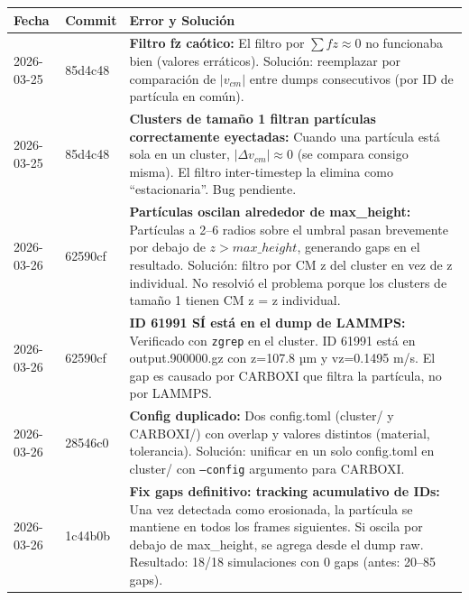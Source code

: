 \documentclass[12pt,a4paper]{article}
\begin{document}
\begin{table}[H]
	\centering
	\begin{tabular}{@{}llp{9cm}@{}}
		\toprule
		\textbf{Fecha} & \textbf{Commit} & \textbf{Error y Solución}                                                                                                                                                                                                                                                                                                          \\
		\midrule
		2026-03-25     & 85d4c48         & \textbf{Filtro fz caótico:} El filtro por $\sum fz \approx 0$ no funcionaba bien (valores erráticos). Solución: reemplazar por comparación de $|v_{cm}|$ entre dumps consecutivos (por ID de partícula en común).                                                                                                                  \\
		2026-03-25     & 85d4c48         & \textbf{Clusters de tamaño 1 filtran partículas correctamente eyectadas:} Cuando una partícula está sola en un cluster, $|\Delta v_{cm}| \approx 0$ (se compara consigo misma). El filtro inter-timestep la elimina como ``estacionaria''. Bug pendiente.                                                                          \\
		2026-03-26     & 62590cf         & \textbf{Partículas oscilan alrededor de max\_height:} Partículas a 2--6 radios sobre el umbral pasan brevemente por debajo de $z > max\_height$, generando gaps en el resultado. Solución: filtro por CM z del cluster en vez de z individual. No resolvió el problema porque los clusters de tamaño 1 tienen CM z = z individual. \\
		2026-03-26     & 62590cf         & \textbf{ID 61991 SÍ está en el dump de LAMMPS:} Verificado con \texttt{zgrep} en el cluster. ID 61991 está en output.900000.gz con z=107.8 µm y vz=0.1495 m/s. El gap es causado por CARBOXI que filtra la partícula, no por LAMMPS.                                                                                               \\
		2026-03-26     & 28546c0         & \textbf{Config duplicado:} Dos config.toml (cluster/ y CARBOXI/) con overlap y valores distintos (material, tolerancia). Solución: unificar en un solo config.toml en cluster/ con \texttt{--config} argumento para CARBOXI.                                                                                                       \\
		2026-03-26     & 1c44b0b         & \textbf{Fix gaps definitivo: tracking acumulativo de IDs:} Una vez detectada como erosionada, la partícula se mantiene en todos los frames siguientes. Si oscila por debajo de max\_height, se agrega desde el dump raw. Resultado: 18/18 simulaciones con 0 gaps (antes: 20--85 gaps).                                            \\
		\bottomrule
	\end{tabular}
\end{table}
\end{document}
